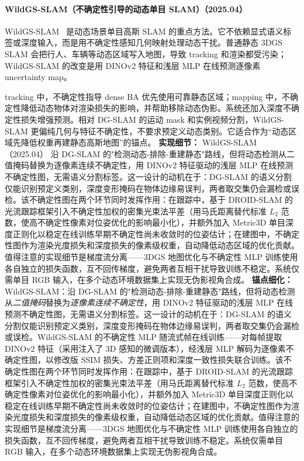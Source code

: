 \paragraph{WildGS-SLAM（不确定性引导的动态单目 SLAM）（2025.04）}
WildGS-SLAM~\cite{2504_03886} 是动态场景单目高斯 SLAM 的重点方法。它不依赖显式语义标签或深度输入，而是用不确定性感知几何映射处理动态干扰。普通静态 3DGS SLAM 会把行人、车辆等动态区域写入地图，导致 tracking 和渲染都受污染；WildGS-SLAM 的改变是用 DINOv2 特征和浅层 MLP 在线预测逐像素 uncertainty map。

tracking 中，不确定性指导 dense BA 优先使用可靠静态区域；mapping 中，不确定性降低动态物体对渲染损失的影响，并帮助移除动态伪影。系统还加入深度不确定性损失增强预测。相对 DG-SLAM 的运动 mask 和实例视频分割，WildGS-SLAM 更偏纯几何与特征不确定性，不要求预定义动态类别。它适合作为“动态区域先降低权重再建静态高斯地图”的锚点。
\textbf{实现细节：} WildGS-SLAM（2025.04） 沿 DG-SLAM 的"检测动态-排除-重建静态"路线，但将动态检测从二值掩码替换为逐像素连续不确定性，用 DINOv2 特征驱动的浅层 MLP 在线预测不确定性图，无需语义分割标签。这一设计的动机在于：DG-SLAM 的语义分割仅能识别预定义类别，深度变形掩码在物体边缘易误判，两者取交集仍会漏检或误检。该不确定性图在两个环节同时发挥作用：在跟踪中，基于 DROID-SLAM 的光流跟踪框架引入不确定性加权的密集光束法平差（用马氏距离替代标准 $L_2$ 范数，使高不确定性像素对位姿优化的影响最小化），并额外加入 Metric3D 单目深度正则化以稳定在线训练早期不确定性尚未收敛时的位姿估计；在建图中，不确定性图作为渲染光度损失和深度损失的像素级权重，自动降低动态区域的优化贡献。值得注意的实现细节是梯度流分离——3DGS 地图优化与不确定性 MLP 训练使用各自独立的损失函数，互不回传梯度，避免两者互相干扰导致训练不稳定。系统仅需单目 RGB 输入，在多个动态环境数据集上实现无伪影视角合成。
\textbf{锚点细化：} WildGS-SLAM：沿 DG-SLAM 的"检测动态-排除-重建静态"路线，但将动态检测从\emph{二值掩码}替换为\emph{逐像素连续不确定性}，用 DINOv2 特征驱动的浅层 MLP 在线预测不确定性图，无需语义分割标签。这一设计的动机在于：DG-SLAM 的语义分割仅能识别预定义类别，深度变形掩码在物体边缘易误判，两者取交集仍会漏检或误检。WildGS-SLAM 的不确定性 MLP 随流式帧在线训练——对每帧提取 DINOv2 特征（采用注入了 3D 感知的微调版本），经浅层 MLP 解码为逐像素不确定性图，以修改版 SSIM 损失、方差正则项和深度一致性损失联合训练。该不确定性图在两个环节同时发挥作用：在跟踪中，基于 DROID-SLAM 的光流跟踪框架引入不确定性加权的密集光束法平差（用马氏距离替代标准 $L_2$ 范数，使高不确定性像素对位姿优化的影响最小化），并额外加入 Metric3D 单目深度正则化以稳定在线训练早期不确定性尚未收敛时的位姿估计；在建图中，不确定性图作为渲染光度损失和深度损失的像素级权重，自动降低动态区域的优化贡献。值得注意的实现细节是梯度流分离——3DGS 地图优化与不确定性 MLP 训练使用各自独立的损失函数，互不回传梯度，避免两者互相干扰导致训练不稳定。系统仅需单目 RGB 输入，在多个动态环境数据集上实现无伪影视角合成。
